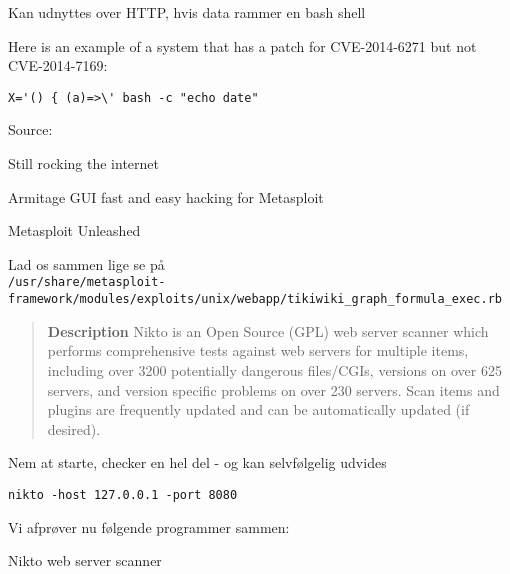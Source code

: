\documentclass[20pt,landscape,a4paper,footrule]{foils}
\begin{document}
\centerline{Kan udnyttes over HTTP, hvis data rammer en bash shell}


Here is an example of a system that has a patch for CVE-2014-6271 but not CVE-2014-7169:



\verb+X='() { (a)=>\' bash -c "echo date"+

Source: 



\begin{list1}
\item Still rocking the internet\\
\item Armitage GUI fast and easy hacking for Metasploit\\
\item Metasploit Unleashed\\
\end{list1}

Lad os sammen lige se på\\
{\tiny\verb+/usr/share/metasploit-framework/modules/exploits/unix/webapp/tikiwiki_graph_formula_exec.rb+}




\centerline{}





\begin{quote}
{\bf Description}
Nikto is an Open Source (GPL) web server scanner which performs
comprehensive tests against web servers for multiple items, including
over 3200 potentially dangerous files/CGIs, versions on over 625
servers, and version specific problems on over 230 servers. Scan items
and plugins are frequently updated and can be automatically updated
(if desired).
\end{quote}

\begin{list1}
\item Nem at starte, checker en hel del - og kan selvfølgelig udvides
\item \verb+nikto -host 127.0.0.1 -port 8080+
\item Vi afprøver nu følgende programmer sammen:
\item Nikto web server scanner 
\end{list1}
\end{document}
